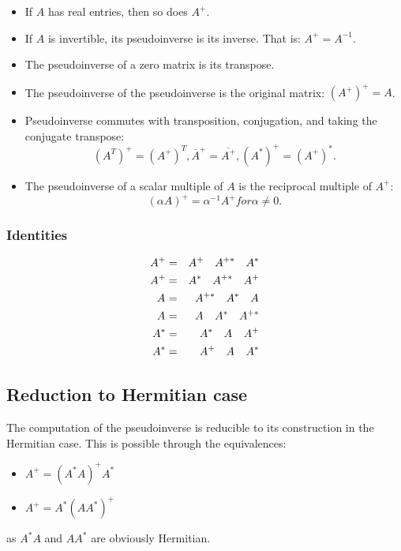 \begin{itemize}
    \item If $A$ has real entries, then so does $A^+$.
    \item If $A$ is invertible, its pseudoinverse is its inverse. That is: $A^+ = A^{-1}$.
    \item The pseudoinverse of a zero matrix is its transpose.
    \item The pseudoinverse of the pseudoinverse is the original matrix: $(A^+)^+ = A$.
    \item Pseudoinverse commutes with transposition, conjugation, and taking the conjugate transpose:
        \begin{equation}
            (A^T)^+ = (A^+)^T, \overline{A}^+ = \overline{A^+}, (A^*)^+ = (A^+)^*.
            \label{eq0.2.3}
        \end{equation}
    \item The pseudoinverse of a scalar multiple of $A$ is the reciprocal multiple of $A^+$:
        \begin{equation}
            (\alpha A)^+ = \alpha^{-1} A^+ for \alpha \neq 0.
            \label{eq0.2.4}
        \end{equation}
\end{itemize}

\subsubsection{Identities}
\begin{eqnarray}
    A^{+} &=& A^{+} \quad A^{+*} \quad A^{*} \notag \\
    A^{+} &=& A^{*} \quad A^{+*} \quad A^{+} \notag\\
    A^{} &=& A^{+*} \quad A^{*} \quad A^{} \notag\\
    A^{} &=& A^{} \quad A^{*} \quad A^{+*} \notag\\
    A^{*} &=& A^{*} \quad A^{} \quad A^{+} \notag\\
    A^{*} &=& A^{+} \quad A^{} \quad A^{*} 
    \label{eq0.2.5}
\end{eqnarray}


\subsection{Reduction to Hermitian case}
The computation of the pseudoinverse is reducible to its construction in the Hermitian case. This is possible through the equivalences:
\begin{itemize}
    \item $A^+ = (A^*A)^+A^*$
    \item $A^+ = A^*(AA^*)^+$
\end{itemize}
as $A^*A$ and $AA^*$ are obviously Hermitian.

